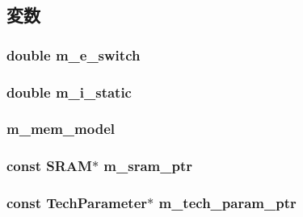 \subsection{変数}
\hypertarget{classMemUnit_a7ce8ef1ca298dcacf23bf88066e5eb5d}{
\subsubsection[{m\_\-e\_\-switch}]{\setlength{\rightskip}{0pt plus 5cm}double {\bf m\_\-e\_\-switch}}}
\label{classMemUnit_a7ce8ef1ca298dcacf23bf88066e5eb5d}
\hypertarget{classMemUnit_a16f0c9e5942378eab4d83da3c61aba7f}{
\subsubsection[{m\_\-i\_\-static}]{\setlength{\rightskip}{0pt plus 5cm}double {\bf m\_\-i\_\-static}}}
\label{classMemUnit_a16f0c9e5942378eab4d83da3c61aba7f}
\hypertarget{classMemUnit_ab0ab3d5054315ae2b4774def19e49725}{
\subsubsection[{m\_\-mem\_\-model}]{ {\bf m\_\-mem\_\-model}}}
\label{classMemUnit_ab0ab3d5054315ae2b4774def19e49725}
\hypertarget{classMemUnit_aab5dce4213ab482c5e1909bfc96d62af}{
\subsubsection[{m\_\-sram\_\-ptr}]{\setlength{\rightskip}{0pt plus 5cm}const {\bf SRAM}$\ast$ {\bf m\_\-sram\_\-ptr}}}
\label{classMemUnit_aab5dce4213ab482c5e1909bfc96d62af}
\hypertarget{classMemUnit_a11d1644aa2bfe0e16783dface6fadf13}{
\subsubsection[{m\_\-tech\_\-param\_\-ptr}]{\setlength{\rightskip}{0pt plus 5cm}const {\bf TechParameter}$\ast$ {\bf m\_\-tech\_\-param\_\-ptr}}}
\label{classMemUnit_a11d1644aa2bfe0e16783dface6fadf13}


